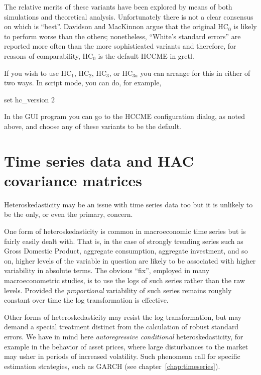 The relative merits of these variants have been explored by means of
both simulations and theoretical analysis.  Unfortunately there is not
a clear consensus on which is ``best''.  Davidson and MacKinnon argue
that the original HC$_0$ is likely to perform worse than the others;
nonetheless, ``White's standard errors'' are reported more often than
the more sophisticated variants and therefore, for reasons of
comparability, HC$_0$ is the default HCCME in gretl.

If you wish to use HC$_1$, HC$_2$, HC$_3$, or HC$_{3a}$ you can arrange
for this in either of two ways.  In script mode, you can do, for example,
%
\begin{code}
set hc_version 2
\end{code}
%
In the GUI program you can go to the HCCME configuration dialog, as
noted above, and choose any of these variants to be the default.


\section{Time series data and HAC covariance matrices}
\label{vcv-hac}

Heteroskedasticity may be an issue with time series data too but it
is unlikely to be the only, or even the primary, concern.  

One form of heteroskedasticity is common in macroeconomic time series
but is fairly easily dealt with.  That is, in the case of strongly
trending series such as Gross Domestic Product, aggregate consumption,
aggregate investment, and so on, higher levels of the variable in
question are likely to be associated with higher variability in
absolute terms.  The obvious ``fix'', employed in many
macroeconometric studies, is to use the logs of such series rather
than the raw levels.  Provided the \textit{proportional} variability
of such series remains roughly constant over time the log
transformation is effective.  

Other forms of heteroskedasticity may resist the log transformation,
but may demand a special treatment distinct from the calculation of
robust standard errors.  We have in mind here \textit{autoregressive
  conditional} heteroskedasticity, for example in the behavior of
asset prices, where large disturbances to the market may usher in
periods of increased volatility.  Such phenomena call for specific
estimation strategies, such as GARCH (see
chapter~\ref{chap:timeseries}).

